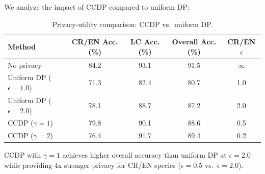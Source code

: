 We analyze the impact of CCDP compared to uniform DP:

\begin{table}[H]
\centering
\caption{Privacy-utility comparison: CCDP vs.\ uniform DP.}
\label{tab:privacy_utility}
\begin{tabular}{@{}lcccc@{}}
\toprule
\textbf{Method} & \textbf{CR/EN Acc. (\%)} & \textbf{LC Acc. (\%)} & \textbf{Overall Acc. (\%)} & \textbf{CR/EN $\epsilon$} \\
\midrule
No privacy & 84.2 & 93.1 & 91.5 & $\infty$ \\
Uniform DP ($\epsilon=1.0$) & 71.3 & 82.4 & 80.7 & 1.0 \\
Uniform DP ($\epsilon=2.0$) & 78.1 & 88.7 & 87.2 & 2.0 \\
CCDP ($\gamma=1$) & 79.8 & 90.1 & 88.6 & 0.5 \\
CCDP ($\gamma=2$) & 76.4 & 91.7 & 89.4 & 0.2 \\
\bottomrule
\end{tabular}
\end{table}

CCDP with $\gamma=1$ achieves higher overall accuracy than uniform DP at $\epsilon=2.0$ while providing 4x stronger privacy for CR/EN species ($\epsilon=0.5$ vs.\ $\epsilon=2.0$).

